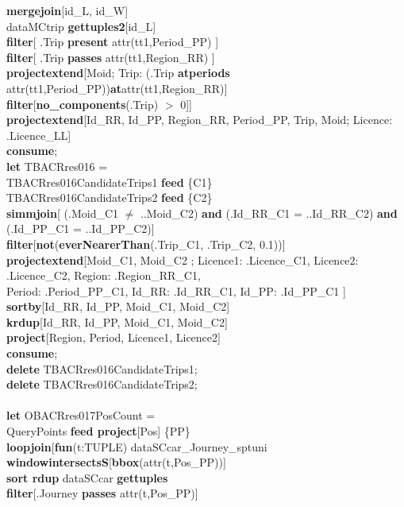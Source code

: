 \documentclass[a4paper]{article}
\newcommand{\op}[1]{\textbf{#1}}
\begin{document}
\begin{scriptsize}
\begin{tabbing}
\>\>\op{mergejoin}[id\_L, id\_W]\\
\>\>dataMCtrip \op{gettuples2}[id\_L]\\
\>\>\op{filter}[ .Trip \op{present} attr(tt1,Period\_PP) ]\\
\>\>\op{filter}[ .Trip \op{passes}  attr(tt1,Region\_RR) ]\\
\>\>\op{projectextend}[Moid; Trip: (.Trip \op{atperiods} attr(tt1,Period\_PP))\op{at}attr(tt1,Region\_RR)]\\
\>\>\op{filter}[\op{no\_components}(.Trip) $>$ 0]]\\
\>\op{projectextend}[Id\_RR, Id\_PP, Region\_RR, Period\_PP, Trip, Moid; Licence: .Licence\_LL]\\
\op{consume};\\
\op{let} TBACRres016 =\\
\>TBACRres016CandidateTrips1 \op{feed} \{C1\}\\
\>TBACRres016CandidateTrips2 \op{feed} \{C2\}\\
\>\op{simmjoin}[ (.Moid\_C1 $\neq$ ..Moid\_C2) \op{and} (.Id\_RR\_C1 = ..Id\_RR\_C2) \op{and} (.Id\_PP\_C1 = ..Id\_PP\_C2)]\\
\>\op{filter}[\op{not}(\op{everNearerThan}(.Trip\_C1, .Trip\_C2, 0.1))]\\
\>\op{projectextend}[Moid\_C1, Moid\_C2 ; Licence1: .Licence\_C1, Licence2: .Licence\_C2, Region: .Region\_RR\_C1,\\
\>\>\>Period: .Period\_PP\_C1, Id\_RR: .Id\_RR\_C1, Id\_PP: .Id\_PP\_C1 ]\\
\>\op{sortby}[Id\_RR, Id\_PP, Moid\_C1, Moid\_C2]\\
\>\op{krdup}[Id\_RR, Id\_PP, Moid\_C1, Moid\_C2]\\
\>\op{project}[Region, Period, Licence1, Licence2]\\
\op{consume};\\
\op{delete} TBACRres016CandidateTrips1;\\
\op{delete} TBACRres016CandidateTrips2;\\
\\
\op{let} OBACRres017PosCount =\\
\>QueryPoints \op{feed project}[Pos] \{PP\}\\
\>\op{loopjoin}[\op{fun}(t:TUPLE) dataSCcar\_Journey\_sptuni \op{windowintersectsS}[\op{bbox}(attr(t,Pos\_PP))]\\
\>\>\op{sort rdup} dataSCcar \op{gettuples}\\
\>\>\op{filter}[.Journey \op{passes} attr(t,Pos\_PP)]\\

\end{tabbing}
\end{scriptsize}
\end{document}
